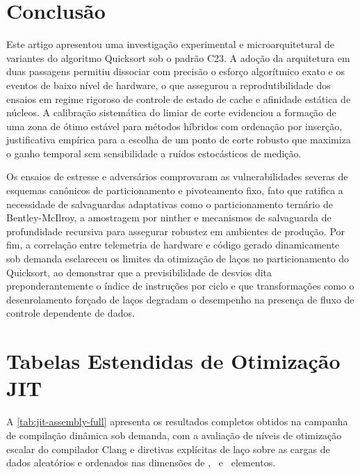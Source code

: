 \documentclass[12pt]{article}
\begin{document}
\section{Conclusão}\label{sec:conclusao}

Este artigo apresentou uma investigação experimental e microarquitetural de variantes do algoritmo Quicksort sob o padrão C23. A adoção da arquitetura em duas passagens permitiu dissociar com precisão o esforço algorítmico exato e os eventos de baixo nível de hardware, o que assegurou a reprodutibilidade dos ensaios em regime rigoroso de controle de estado de cache e afinidade estática de núcleos. A calibração sistemática do limiar de corte evidenciou a formação de uma zona de ótimo estável para métodos híbridos com ordenação por inserção, justificativa empírica para a escolha de um ponto de corte robusto que maximiza o ganho temporal sem sensibilidade a ruídos estocásticos de medição.

Os ensaios de estresse e adversários comprovaram as vulnerabilidades severas de esquemas canônicos de particionamento e pivoteamento fixo, fato que ratifica a necessidade de salvaguardas adaptativas como o particionamento ternário de Bentley-McIlroy, a amostragem por ninther e mecanismos de salvaguarda de profundidade recursiva para assegurar robustez em ambientes de produção. Por fim, a correlação entre telemetria de hardware e código gerado dinamicamente sob demanda esclareceu os limites da otimização de laços no particionamento do Quicksort, ao demonstrar que a previsibilidade de desvios dita preponderantemente o índice de instruções por ciclo e que transformações como o desenrolamento forçado de laços degradam o desempenho na presença de fluxo de controle dependente de dados.




\clearpage
\appendix
\section{Tabelas Estendidas de Otimização JIT}\label{sec:apendice}

A \cref{tab:jit-assembly-full} apresenta os resultados completos obtidos na campanha de compilação dinâmica sob demanda, com a avaliação de níveis de otimização escalar do compilador Clang e diretivas explícitas de laço sobre as cargas de dados aleatórios e ordenados nas dimensões de \ValCalNSmall, \ValCalNLarge\ e \ValCalNHundredK\ elementos.
\end{document}
